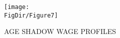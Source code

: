 \hypertarget{AgeShadow}{}
\begin{figure}[tbp]
  \centerline{\texttt{[image: \\FigDir/Figure7]}}
  \caption{AGE SHADOW WAGE PROFILES}
  \label{fig:AgeShadow}
\end{figure}
